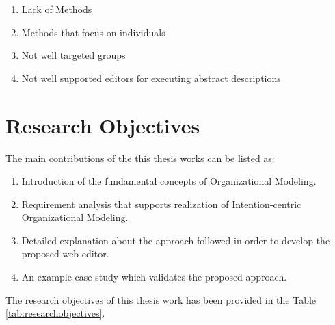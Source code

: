 \begin{enumerate}
	\item Lack of Methods
	\item Methods that focus on individuals
	\item Not well targeted groups
	\item Not well supported editors for executing abstract descriptions
\end{enumerate}


\section {Research Objectives}
\label{sec:researchobjectives}
The main contributions of the this thesis works can be listed as:

\begin{enumerate}
	\item Introduction of the fundamental concepts of Organizational Modeling.
	\item Requirement analysis that supports realization of Intention-centric Organizational Modeling.
	\item Detailed explanation about the approach followed in order to develop the proposed web editor.
	\item An example case study which validates the proposed approach.
\end{enumerate}


\label{sec:researchobj}
The research objectives of this thesis work has been provided in the Table \ref{tab:researchobjectives}.

